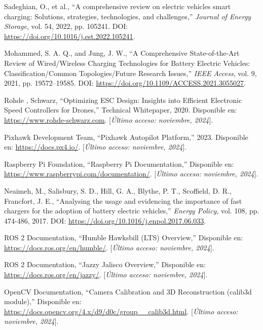 \begin{thebibliography}{30}
    Sadeghian, O., et al., ``A comprehensive review on electric vehicles smart charging: Solutions, strategies, technologies, and challenges,'' \textit{Journal of Energy Storage}, vol. 54, 2022, pp. 105241. DOI: \url{https://doi.org/10.1016/j.est.2022.105241}.

    Mohammed, S. A. Q., and Jung, J. W., ``A Comprehensive State-of-the-Art Review of Wired/Wireless Charging Technologies for Battery Electric Vehicles: Classification/Common Topologies/Future Research Issues,'' \textit{IEEE Access}, vol. 9, 2021, pp. 19572--19585. DOI: \url{https://doi.org/10.1109/ACCESS.2021.3055027}.

    Rohde , Schwarz, ``Optimizing ESC Design: Insights into Efficient Electronic Speed Controllers for Drones,'' Technical Whitepaper, 2020. Disponible en: \url{https://www.rohde-schwarz.com}. [\textit{Último acceso: noviembre, 2024}].

    Pixhawk Development Team, ``Pixhawk Autopilot Platform,'' 2023. Disponible en: \url{https://docs.px4.io/}. [\textit{Último acceso: noviembre, 2024}].

    Raspberry Pi Foundation, ``Raspberry Pi Documentation,'' Disponible en: \url{https://www.raspberrypi.com/documentation/}. [\textit{Último acceso: noviembre, 2024}].

    Neaimeh, M., Salisbury, S. D., Hill, G. A., Blythe, P. T., Scoffield, D. R., Francfort, J. E., ``Analysing the usage and evidencing the importance of fast chargers for the adoption of battery electric vehicles,'' \textit{Energy Policy}, vol. 108, pp. 474-486, 2017. DOI: \url{https://doi.org/10.1016/j.enpol.2017.06.033}.

    ROS 2 Documentation, ``Humble Hawksbill (LTS) Overview,'' Disponible en: \url{https://docs.ros.org/en/humble/}. [\textit{Último acceso: noviembre, 2024}].
    
    ROS 2 Documentation, ``Jazzy Jalisco Overview,'' Disponible en: \url{https://docs.ros.org/en/jazzy/}. [\textit{Último acceso: noviembre, 2024}].

    OpenCV Documentation, ``Camera Calibration and 3D Reconstruction (calib3d module),'' Disponible en: \url{https://docs.opencv.org/4.x/d9/d0c/group__calib3d.html}. [\textit{Último acceso: noviembre, 2024}].


\end{thebibliography}
